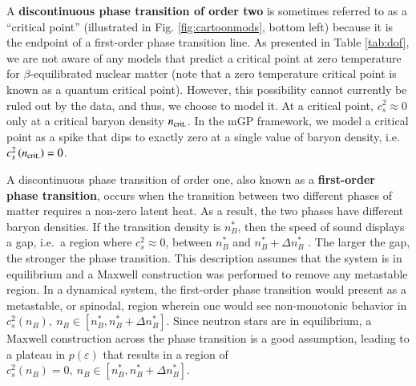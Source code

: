 \documentclass[aps,prd,nofootinbib,tightenlines,notitlepage,floatfix,superscriptaddress,showkeys,twocolumn]{revtex4-1}
\begin{document}
A {\bf discontinuous phase transition of order two} is sometimes referred to as a ``critical point'' (illustrated in Fig. \ref{fig:cartoonmods}, bottom left) because it is the endpoint of a first-order phase transition line. As presented in Table \ref{tab:dof}, we are not aware of any models that predict a critical point at zero temperature for $\beta$-equilibrated nuclear matter (note that a zero temperature critical point is known as a quantum critical point). However, this possibility cannot currently be ruled out by the data, and thus, we choose to model it. At a critical point, $c_s^2 \approx 0$ only at a critical baryon density $n_{\rm crit.}$. In the mGP framework, we model a critical point as a spike that dips to exactly zero at a single value of baryon density, i.e. $c_s^2 \left(n_{\rm crit.}\right) = 0$. 

A discontinuous phase transition of order one, also known as a {\bf first-order phase transition}, occurs when the transition between two different phases of matter requires a non-zero latent heat. As a result, the two phases have different baryon densities. If the transition density is $n_B^*$,  then the speed of sound displays a gap, i.e.~a region where $c_s^2 \approx 0$, between $n_B^*$ and $n_B^* + \Delta n^*_B$ . The larger the gap, the stronger the phase transition.  This description assumes that the system is in equilibrium and a Maxwell construction was performed to remove any metastable region. In a dynamical system, the first-order phase transition would present as a metastable, or spinodal, region wherein one would see non-monotonic behavior in $c_s^2(n_B), \ n_B \in [n_B^*,n_B^* + \Delta n^*_B]$.  
Since neutron stars are in equilibrium,  a Maxwell construction across the phase transition is a good assumption, leading to a plateau in $p(\varepsilon)$ that results in a region of $c_s^2(n_B) = 0, \ n_B \in [n_B^*,n_B^* + \Delta n^*_B]$. 
\end{document}
